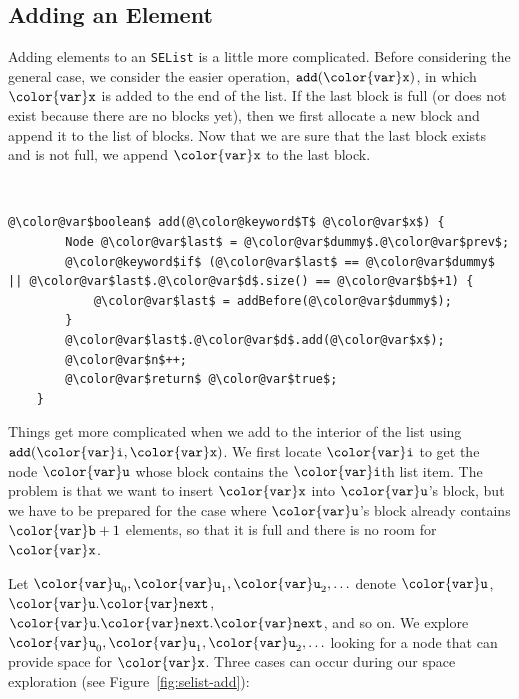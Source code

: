 \documentclass[10pt]{book}
\newcommand{\pcodeimport}[1]{}
\newcommand{\figref}[1]{Figure~\ref{fig:#1}}
\theoremstyle{plain}
\theoremstyle{definition}
\begin{document}
\subsection{Adding an Element}

Adding elements to an \texttt{SEList} is a little more complicated.  Before
considering the general case, we consider the easier operation, \ensuremath{\mathtt{add({\color{var}x})}},
in which \ensuremath{\mathtt{{\color{var}x}}} is added to the end of the list.  If the last block is full
(or does not exist because there are no blocks yet), then we first
allocate a new block and append it to the list of blocks.  Now that
we are sure that the last block exists and is not full, we append \ensuremath{\mathtt{{\color{var}x}}}
to the last block.



 \ \vspace{.5ex}\begin{Verbatim}[gobble=1,tabsize=2,frame=single,framerule=1.2pt,commandchars=\\@\$,label=\texttt{SEList},labelposition=topline]
	@\color@var$boolean$ add(@\color@keyword$T$ @\color@var$x$) {
		Node @\color@var$last$ = @\color@var$dummy$.@\color@var$prev$;
		@\color@keyword$if$ (@\color@var$last$ == @\color@var$dummy$ || @\color@var$last$.@\color@var$d$.size() == @\color@var$b$+1) {
			@\color@var$last$ = addBefore(@\color@var$dummy$);
		}
		@\color@var$last$.@\color@var$d$.add(@\color@var$x$);
		@\color@var$n$++;
		@\color@var$return$ @\color@var$true$;
	}
\end{Verbatim}

\pcodeimport{ods/SEList.append(x)}

Things get more complicated when we add to the interior of the list
using \ensuremath{\mathtt{add({\color{var}i},{\color{var}x})}}.  We first locate \ensuremath{\mathtt{{\color{var}i}}} to get the node \ensuremath{\mathtt{{\color{var}u}}} whose block
contains the \ensuremath{\mathtt{{\color{var}i}}}th list item.  The problem is that we want to insert
\ensuremath{\mathtt{{\color{var}x}}} into \ensuremath{\mathtt{{\color{var}u}}}'s block, but we have to be prepared for the case where
\ensuremath{\mathtt{{\color{var}u}}}'s block already contains $\ensuremath{\mathtt{{\color{var}b}}}+1$ elements, so that it is full and
there is no room for \ensuremath{\mathtt{{\color{var}x}}}.

Let $\ensuremath{\mathtt{{\color{var}u}}}_0,\ensuremath{\mathtt{{\color{var}u}}}_1,\ensuremath{\mathtt{{\color{var}u}}}_2,\ldots$ denote \ensuremath{\mathtt{{\color{var}u}}}, \ensuremath{\mathtt{{\color{var}u}.{\color{var}next}}}, \ensuremath{\mathtt{{\color{var}u}.{\color{var}next}.{\color{var}next}}},
and so on.  We explore $\ensuremath{\mathtt{{\color{var}u}}}_0,\ensuremath{\mathtt{{\color{var}u}}}_1,\ensuremath{\mathtt{{\color{var}u}}}_2,\ldots$ looking for a node
that can provide space for \ensuremath{\mathtt{{\color{var}x}}}.  Three cases can occur during our
space exploration (see \figref{selist-add}):
\end{document}
